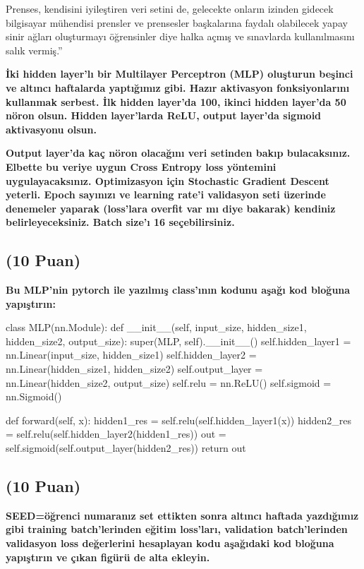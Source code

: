 \documentclass[11pt]{article}
\begin{document}
Prenses, kendisini iyileştiren veri setini de, gelecekte onların izinden gidecek bilgisayar mühendisi prensler ve prensesler başkalarına faydalı olabilecek yapay sinir ağları oluşturmayı öğrensinler diye halka açmış ve sınavlarda kullanılmasını salık vermiş.''

\textbf{İki hidden layer'lı bir Multilayer Perceptron (MLP) oluşturun beşinci ve altıncı haftalarda yaptığımız gibi. Hazır aktivasyon fonksiyonlarını kullanmak serbest. İlk hidden layer'da 100, ikinci hidden layer'da 50 nöron olsun. Hidden layer'larda ReLU, output layer'da sigmoid aktivasyonu olsun.}

\textbf{Output layer'da kaç nöron olacağını veri setinden bakıp bulacaksınız. Elbette bu veriye uygun Cross Entropy loss yöntemini uygulayacaksınız. Optimizasyon için Stochastic Gradient Descent yeterli. Epoch sayınızı ve learning rate'i validasyon seti üzerinde denemeler yaparak (loss'lara overfit var mı diye bakarak) kendiniz belirleyeceksiniz. Batch size'ı 16 seçebilirsiniz.}

\subsection{(10 Puan)} \textbf{Bu MLP'nin pytorch ile yazılmış class'ının kodunu aşağı kod bloğuna yapıştırın:}

\begin{python}
class MLP(nn.Module):
    def __init__(self, input_size, hidden_size1, hidden_size2, output_size):
        super(MLP, self).__init__()
        self.hidden_layer1 = nn.Linear(input_size, hidden_size1)
        self.hidden_layer2 = nn.Linear(hidden_size1, hidden_size2)
        self.output_layer = nn.Linear(hidden_size2, output_size)
        self.relu = nn.ReLU()
        self.sigmoid = nn.Sigmoid()

    def forward(self, x):
        hidden1_res = self.relu(self.hidden_layer1(x))
        hidden2_res = self.relu(self.hidden_layer2(hidden1_res))
        out = self.sigmoid(self.output_layer(hidden2_res))
        return out
\end{python}

\subsection{(10 Puan)} \textbf{SEED=öğrenci numaranız set ettikten sonra altıncı haftada yazdığımız gibi training batch'lerinden eğitim loss'ları, validation batch'lerinden validasyon loss değerlerini hesaplayan kodu aşağıdaki kod bloğuna yapıştırın ve çıkan figürü de alta ekleyin.}
\end{document}
